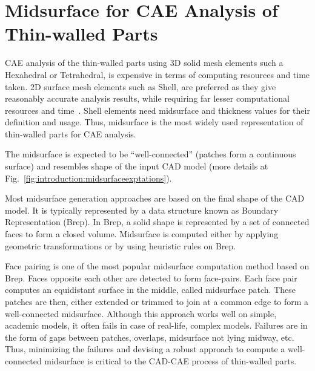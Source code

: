 \section{Midsurface for CAE Analysis of Thin-walled Parts} \label{sec:intro:cadcae}

CAE analysis of the thin-walled parts using 3D solid mesh elements such a Hexahedral or Tetrahedral, is expensive in terms of computing resources and time taken. 2D surface mesh elements such as Shell, are preferred as they give reasonably accurate analysis results, while requiring far lesser computational resources and time~\cite{Elangovan2012}.  Shell elements need midsurface and thickness values for their definition and usage. Thus, midsurface is the most widely used representation of thin-walled parts for CAE analysis.

The midsurface is expected to be ``well-connected'' (patches form a continuous surface) and resembles shape of the input CAD model (more details at Fig.~\ref{fig:introduction:midsurfaceexptations}).
 
 Most midsurface generation approaches are based on the final shape of the CAD model. It is typically represented by a data structure known as Boundary Representation (Brep). In Brep, a solid shape is represented by a set of connected faces to form a closed volume. Midsurface is computed either by applying geometric transformations or by using heuristic rules on Brep. 
 
Face pairing is one of the most popular midsurface computation method based on Brep. Faces opposite each other are detected to form face-pairs. Each face pair computes an equidistant surface in the middle, called midsurface patch. These patches are then, either extended or trimmed to join at a common edge to form a well-connected midsurface. Although this approach works well on simple, academic models, it often fails in case of real-life, complex models. Failures are in the form of gaps between patches, overlaps, midsurface not lying midway, etc.  Thus, minimizing the failures and devising a robust approach to compute a well-connected midsurface is critical to the CAD-CAE process of thin-walled parts.
 
